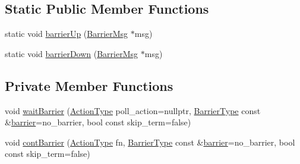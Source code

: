 \subsection*{Static Public Member Functions}
\begin{DoxyCompactItemize}
\item 
static void \hyperlink{structvt_1_1collective_1_1barrier_1_1_barrier_ab229e28e7dea8c0dcdaf07b13173984d}{barrier\+Up} (\hyperlink{structvt_1_1collective_1_1barrier_1_1_barrier_msg}{Barrier\+Msg} $\ast$msg)
\item 
static void \hyperlink{structvt_1_1collective_1_1barrier_1_1_barrier_a81c35871762c47ea8901fe70ac9b8082}{barrier\+Down} (\hyperlink{structvt_1_1collective_1_1barrier_1_1_barrier_msg}{Barrier\+Msg} $\ast$msg)
\end{DoxyCompactItemize}
\subsection*{Private Member Functions}
\begin{DoxyCompactItemize}
\item 
void \hyperlink{structvt_1_1collective_1_1barrier_1_1_barrier_a014858c233344d9fd7e1ffc4050a1d8c}{wait\+Barrier} (\hyperlink{namespacevt_ae0a5a7b18cc99d7b732cb4d44f46b0f3}{Action\+Type} poll\+\_\+action=nullptr, \hyperlink{namespacevt_a25e481f0d6bbc7204db23d1c87a62e77}{Barrier\+Type} const \&\hyperlink{structvt_1_1collective_1_1barrier_1_1_barrier_a05124050c7d353a4f3475ee1875dd46a}{barrier}=no\+\_\+barrier, bool const skip\+\_\+term=false)
\item 
void \hyperlink{structvt_1_1collective_1_1barrier_1_1_barrier_aecec014f5db3d5b608ca553a91acc732}{cont\+Barrier} (\hyperlink{namespacevt_ae0a5a7b18cc99d7b732cb4d44f46b0f3}{Action\+Type} fn, \hyperlink{namespacevt_a25e481f0d6bbc7204db23d1c87a62e77}{Barrier\+Type} const \&\hyperlink{structvt_1_1collective_1_1barrier_1_1_barrier_a05124050c7d353a4f3475ee1875dd46a}{barrier}=no\+\_\+barrier, bool const skip\+\_\+term=false)
\end{DoxyCompactItemize}
